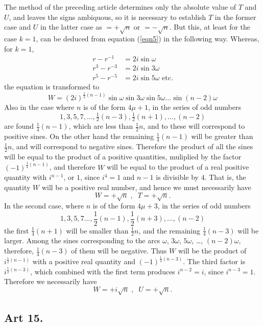 \documentclass{book}
\theoremstyle{plain}
\theoremstyle{remark}
\begin{document}
The method of the preceding article determines only the absolute value of $T$ and $U$, and leaves the signs ambiquous, so it is necessary to establish $T$ in the former case and $U$ in the latter case as $= +\sqrt{n}$ or $=-\sqrt{n}$.  But this, at least for the case $k=1$, can be deduced from equation (\ref{eqn5}) in the following way.   Whereas, for $k=1$, 
\begin{align*}
 r - r^{-1} &= 2i \sin \omega \\
r^3-r^{-3} &= 2i \sin 3\omega \\
r^5-r^{-5} &= 2i \sin 5 \omega \textrm{ etc.} 
\end{align*}
the equation is transformed to
\[ W = (2i)^{\frac{1}{2}(n-1)} \sin \omega \sin 3\omega \sin 5 \omega \dots \sin (n-2) \omega \]
Also in the case where $n$ is of the form $4\mu+1$, in the series of odd numbers
\[ 1,3,5,7,\dots,\tfrac{1}{2}(n-3), \tfrac{1}{2}(n+1), \dots, (n-2) \]
are found $\frac{1}{4}(n-1)$, which are less than $\frac{1}{2} n$, and to these will correspond to positive sines.  On the other hand the remaining $\frac{1}{4}(n-1)$ will be greater than $\frac{1}{2}n$, and will correspond to negative sines.  Therefore the product of all the sines will be equal to the product of a positive quantities, muliplied by the factor $(-1)^{\frac{1}{4}(n-1)}$, and therefore $W$ will be equal to the product of a real positive quantity with $i^{n-1}$, or $1$, since $i^4 =1$ and $n-1$ is divisible by $4$.  That is, the quantity $W$ will be a positive real number, and hence we must necessarily have 
\[ W = +\sqrt{n} \;, \; \; T = + \sqrt{n}. \]
In the second case, where $n$ is of the form $4\mu+3$, in the series of odd numbers 
\[ 1,3, 5, 7 \dots, \frac{1}{2}(n-1),\frac{1}{2} (n+3), \dots, (n-2) \]
the first $\frac{1}{4}(n+1)$ will be smaller than $\frac{1}{2}n$, and the remaining $\frac{1}{4}(n-3)$ will be larger.  Among the sines corresponding to the arcs $\omega$, $3\omega$, $5\omega$, \dots, $(n-2)\omega$, therefore, $\frac{1}{4}(n-3)$ of them will be negative.  Thus $W$ will be the product of $i^{\frac{1}{2}(n-1)}$ with a positive real quantity and $(-1)^{\frac{1}{4}(n-3)}$.   The third factor is $i^{\frac{1}{2}(n-3)}$, which combined with the first term produces $i^{n-2} = i$, since $i^{n-3} = 1$.   Therefore we necessarily have 
\[ W = +i\sqrt{n}\; , \; \; U = + \sqrt{n}. \]

\subsection*{Art 15.} 
\end{document}
